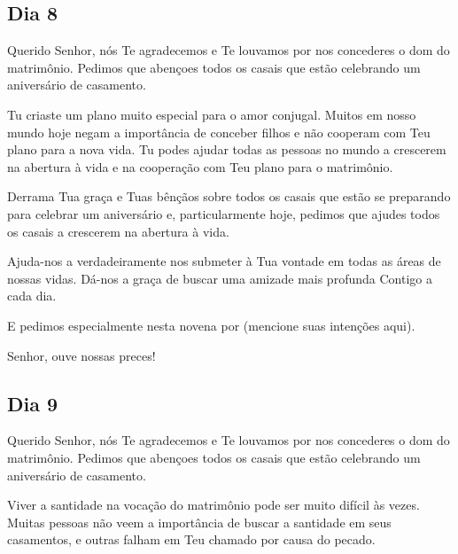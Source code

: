 \documentclass[18pt]{article}
\begin{document}
\begin{center}
 \subsection*{Dia 8}
\end{center}



Querido Senhor, nós Te agradecemos e Te louvamos por nos concederes o dom do matrimônio. Pedimos que abençoes todos os casais que estão celebrando um aniversário de casamento.  

Tu criaste um plano muito especial para o amor conjugal. Muitos em nosso mundo hoje negam a importância de conceber filhos e não cooperam com Teu plano para a nova vida. Tu podes ajudar todas as pessoas no mundo a crescerem na abertura à vida e na cooperação com Teu plano para o matrimônio.  

Derrama Tua graça e Tuas bênçãos sobre todos os casais que estão se preparando para celebrar um aniversário e, particularmente hoje, pedimos que ajudes todos os casais a crescerem na abertura à vida.  

Ajuda-nos a verdadeiramente nos submeter à Tua vontade em todas as áreas de nossas vidas. Dá-nos a graça de buscar uma amizade mais profunda Contigo a cada dia.  

E pedimos especialmente nesta novena por (mencione suas intenções aqui).  

Senhor, ouve nossas preces!  

\begin{center}
 \textbf{}
\end{center}




\begin{center}
 \subsection*{Dia 9}
\end{center}



Querido Senhor, nós Te agradecemos e Te louvamos por nos concederes o dom do matrimônio. Pedimos que abençoes todos os casais que estão celebrando um aniversário de casamento.  

Viver a santidade na vocação do matrimônio pode ser muito difícil às vezes. Muitas pessoas não veem a importância de buscar a santidade em seus casamentos, e outras falham em Teu chamado por causa do pecado.  
\end{document}
